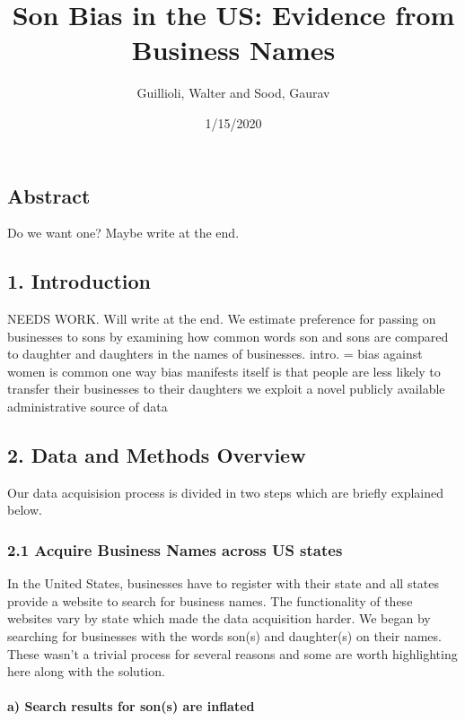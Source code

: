 \documentclass[]{article}
\title{Son Bias in the US: Evidence from Business Names}
\author{Guillioli, Walter and Sood, Gaurav}
\date{1/15/2020}
\let\oldparagraph\paragraph
\renewcommand{\paragraph}[1]{\oldparagraph{#1}\mbox{}}
\begin{document}
\maketitle

\hypertarget{abstract}{%
\subsection{Abstract}\label{abstract}}

Do we want one? Maybe write at the end.

\hypertarget{introduction}{%
\subsection{1. Introduction}\label{introduction}}

NEEDS WORK. Will write at the end. We estimate preference for passing on
businesses to sons by examining how common words son and sons are
compared to daughter and daughters in the names of businesses. intro. =
bias against women is common one way bias manifests itself is that
people are less likely to transfer their businesses to their daughters
we exploit a novel publicly available administrative source of data

\hypertarget{data-and-methods-overview}{%
\subsection{2. Data and Methods
Overview}\label{data-and-methods-overview}}

Our data acquisision process is divided in two steps which are briefly
explained below.

\hypertarget{acquire-business-names-across-us-states}{%
\subsubsection{2.1 Acquire Business Names across US
states}\label{acquire-business-names-across-us-states}}

In the United States, businesses have to register with their state and
all states provide a website to search for business names. The
functionality of these websites vary by state which made the data
acquisition harder. We began by searching for businesses with the words
son(s) and daughter(s) on their names. These wasn't a trivial process
for several reasons and some are worth highlighting here along with the
solution.

\hypertarget{a-search-results-for-sons-are-inflated}{%
\paragraph{a) Search results for son(s) are
inflated}\label{a-search-results-for-sons-are-inflated}}
\end{document}
